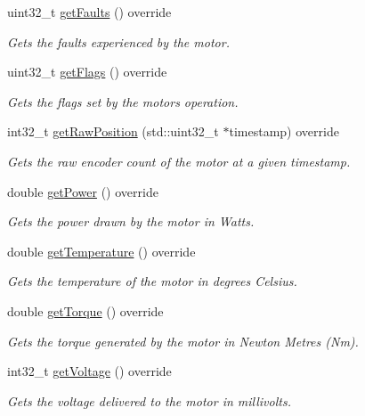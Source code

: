 \begin{DoxyCompactItemize}
uint32\+\_\+t \mbox{\hyperlink{classokapi_1_1ThreadedMockMotor_aa0a748bf7a1f374bd2949ee10bd7ac75}{get\+Faults}} () override
\begin{DoxyCompactList}\small\item\em Gets the faults experienced by the motor. \end{DoxyCompactList}\item 
uint32\+\_\+t \mbox{\hyperlink{classokapi_1_1ThreadedMockMotor_a305a97d40b24de7ed61b2cd499746f83}{get\+Flags}} () override
\begin{DoxyCompactList}\small\item\em Gets the flags set by the motor\textquotesingle{}s operation. \end{DoxyCompactList}\item 
int32\+\_\+t \mbox{\hyperlink{classokapi_1_1ThreadedMockMotor_ab35d721ad64921a6305689c556d15b1b}{get\+Raw\+Position}} (std\+::uint32\+\_\+t $\ast$timestamp) override
\begin{DoxyCompactList}\small\item\em Gets the raw encoder count of the motor at a given timestamp. \end{DoxyCompactList}\item 
double \mbox{\hyperlink{classokapi_1_1ThreadedMockMotor_ab55461a1fefd150480f5bf165ff07589}{get\+Power}} () override
\begin{DoxyCompactList}\small\item\em Gets the power drawn by the motor in Watts. \end{DoxyCompactList}\item 
double \mbox{\hyperlink{classokapi_1_1ThreadedMockMotor_ac84f4119ab3972237339d5bcf12c3f03}{get\+Temperature}} () override
\begin{DoxyCompactList}\small\item\em Gets the temperature of the motor in degrees Celsius. \end{DoxyCompactList}\item 
double \mbox{\hyperlink{classokapi_1_1ThreadedMockMotor_a29747007537750069d82e84b2f79232e}{get\+Torque}} () override
\begin{DoxyCompactList}\small\item\em Gets the torque generated by the motor in Newton Metres (Nm). \end{DoxyCompactList}\item 
int32\+\_\+t \mbox{\hyperlink{classokapi_1_1ThreadedMockMotor_a2a83224b5d791c3aff254b97f783cff2}{get\+Voltage}} () override
\begin{DoxyCompactList}\small\item\em Gets the voltage delivered to the motor in millivolts. \end{DoxyCompactList}\item 

\end{DoxyCompactItemize}
